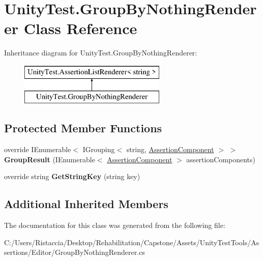 \hypertarget{class_unity_test_1_1_group_by_nothing_renderer}{}\section{Unity\+Test.\+Group\+By\+Nothing\+Renderer Class Reference}
\label{class_unity_test_1_1_group_by_nothing_renderer}
Inheritance diagram for Unity\+Test.\+Group\+By\+Nothing\+Renderer\+:\begin{figure}[H]
\begin{center}
\leavevmode
\includegraphics[height=2.000000cm]{class_unity_test_1_1_group_by_nothing_renderer}
\end{center}
\end{figure}
\subsection*{Protected Member Functions}
\begin{DoxyCompactItemize}
\item 
\mbox{\label{class_unity_test_1_1_group_by_nothing_renderer_aa6578e8a0a32b5d3d0a2352cb91bd449}} 
override I\+Enumerable$<$ I\+Grouping$<$ string, \hyperlink{class_unity_test_1_1_assertion_component}{Assertion\+Component} $>$ $>$ {\bfseries Group\+Result} (I\+Enumerable$<$ \hyperlink{class_unity_test_1_1_assertion_component}{Assertion\+Component} $>$ assertion\+Components)
\item 
\mbox{\label{class_unity_test_1_1_group_by_nothing_renderer_a131ed290ad34946146a066790e5a7de5}} 
override string {\bfseries Get\+String\+Key} (string key)
\end{DoxyCompactItemize}
\subsection*{Additional Inherited Members}


The documentation for this class was generated from the following file\+:\begin{DoxyCompactItemize}
\item 
C\+:/\+Users/\+Ristaccia/\+Desktop/\+Rehabilitation/\+Capstone/\+Assets/\+Unity\+Test\+Tools/\+Assertions/\+Editor/Group\+By\+Nothing\+Renderer.\+cs\end{DoxyCompactItemize}
